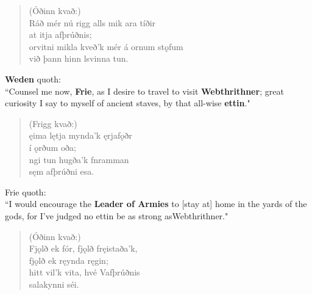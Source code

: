 \bookStart

\begin{verse}
(Óðinn kvað:) \\%
\bva Ráð mér nú rigg \hld alls mik ara tíðir \\%
\ind at itja afþrúðnis; \\%
orvitni mikla \hld kveð'k mér á ornum stǫfum \\%
\ind við þann hinn lsvinna tun.\\%
\end{verse}

\bvb \textbf{Weden} quoth: \\ “Counsel me now, \textbf{Frie}, as I desire to travel to visit \textbf{Webthrithner}; great curiosity I say to myself of ancient staves\footnotemark[1], by that all-wise \textbf{ettin}." \\

\begin{verse}
(Frigg kvað:) \\%
\bva {}ęima lętja \hld mynda'k ęrjafǫðr \\%
\ind í ǫrðum oða; \\%
ngi tun \hld hugða'k fnramman \\%
\ind sęm afþrúðni esa.\\%
\end{verse}

\bvb Frie quoth: \\ “I would encourage the \textbf{Leader of Armies} to [stay at] home in the yards of the gods, for I've judged no ettin be as strong as\footnotemark[3] Webthrithner." \\

\begin{verse}
(Óðinn kvað:) \\%
\bva Fjǫlð ek fór, \hld fjǫlð fręistaða'k, \\%
\ind fjǫlð ek ręynda ręgin; \\%
hitt vil'k vita, \hld hvé Vafþrúðnis \\%
\ind salakynni séi.\\%
\end{verse}

